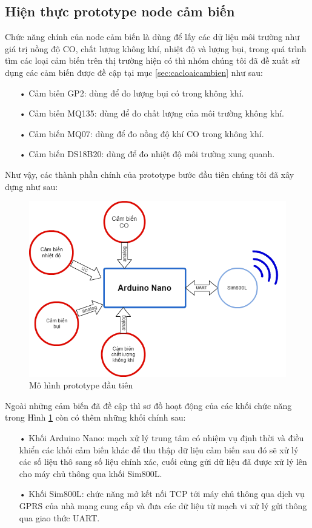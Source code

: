 \subsection{Hiện thực prototype node cảm biến}\label{sc:prototype_dautien}
Chức năng chính của node cảm biến là dùng để lấy các dữ liệu môi trường như giá trị nồng độ CO, chất lượng không khí, nhiệt độ và lượng bụi, trong quá trình tìm các loại cảm biến trên thị trường hiện có thì nhóm chúng tôi đã đề xuất sử dụng các cảm biến được đề cập tại mục \ref{sec:cacloaicambien} như sau:
\begin{itemize}
	\item[•]Cảm biến GP2: dùng để đo lượng bụi có trong không khí.
	\item[•]Cảm  biến MQ135: dùng để đo chất lượng của môi trường không khí.
	\item[•]Cảm biến MQ07: dùng để đo nồng độ khí CO trong không khí.
	\item[•]Cảm biến DS18B20: dùng để đo nhiệt độ môi trường xung quanh. 
\end{itemize}
Như vậy, các thành phần chính của prototype bước đầu tiên chúng tôi đã xây dựng như sau:
\begin{figure}[H]
	\centering    
	\includegraphics[width=5in]{prototype_1}
	\caption[Mô hình prototype đầu tiên]{Mô hình prototype đầu tiên}
	\label{fig:prototype_1}
\end{figure}
Ngoài những cảm biến đã đề cập thì sơ đồ hoạt động của các khối chức năng trong Hình \ref{fig:prototype_1} còn có thêm những khối chính sau:
\begin{itemize}
	\item[•] Khối Arduino Nano: mạch xử lý trung tâm có nhiệm vụ định thời và điều khiển các khối cảm biến khác để thu thập dữ liệu cảm biến sau đó sẽ xử lý các số liệu thô sang số liệu chính xác, cuối cùng gửi dữ liệu đã được xử lý lên cho máy chủ thông qua khối Sim800L.
	\item[•] Khối Sim800L: chức năng mở kết nối TCP tới máy chủ thông qua dịch vụ GPRS của nhà mạng cung cấp và đưa các dữ liệu từ mạch vi xử lý gửi thông qua giao thức UART.
\end{itemize}



